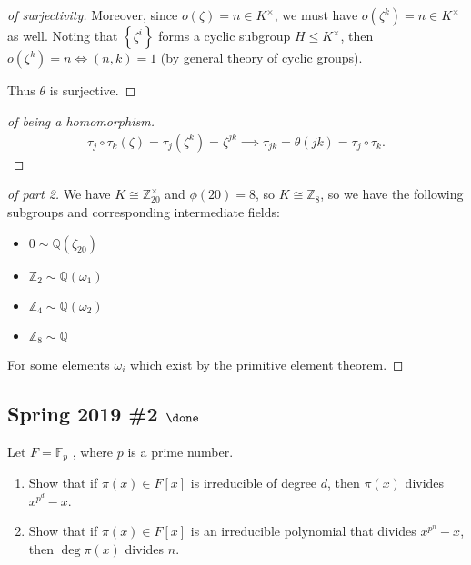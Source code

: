 \begin{solution}
\begin{proof}[of surjectivity]
Moreover, since \(o(\zeta) = n \in K^{\times}\), we must have
\(o(\zeta^k) = n \in K^{\times}\) as well. Noting that
\(\left\{{\zeta^i}\right\}\) forms a cyclic subgroup
\(H\leq K^{\times}\), then \(o(\zeta^k) = n \iff (n, k) = 1\) (by
general theory of cyclic groups).

Thus \(\theta\) is surjective.

\end{proof}

\begin{proof}[of being a homomorphism]

\begin{align*}
\tau_j \circ \tau_k (\zeta) =\tau_j(\zeta^k) = \zeta^{jk} \implies
\tau_{jk} = \theta(jk) = \tau_j \circ \tau_k
.\end{align*}

\end{proof}

\begin{proof}[of part 2]

We have \(K \cong {\mathbb{Z}}_{20}^{\times}\) and \(\phi(20) = 8\), so
\(K \cong {\mathbb{Z}}_8\), so we have the following subgroups and
corresponding intermediate fields:

\begin{itemize}
\tightlist
\item
  \(0 \sim {\mathbb{Q}}(\zeta_{20})\)
\item
  \({\mathbb{Z}}_2 \sim {\mathbb{Q}}(\omega_1)\)
\item
  \({\mathbb{Z}}_4 \sim {\mathbb{Q}}(\omega_2)\)
\item
  \({\mathbb{Z}}_8 \sim {\mathbb{Q}}\)
\end{itemize}

For some elements \(\omega_i\) which exist by the primitive element
theorem.

\end{proof}

\end{solution}

\hypertarget{spring-2019-2-done}{%
\subsection{\texorpdfstring{Spring 2019 \#2
\(\done\)}{Spring 2019 \#2 \textbackslash done}}\label{spring-2019-2-done}}

Let \(F = {\mathbb{F}}_p\) , where \(p\) is a prime number.

\begin{enumerate}
\def\labelenumi{\alph{enumi}.}
\item
  Show that if \(\pi(x) \in F[x]\) is irreducible of degree \(d\), then
  \(\pi(x)\) divides \(x^{p^d} - x\).
\item
  Show that if \(\pi(x) \in F[x]\) is an irreducible polynomial that
  divides \(x^{p^n} - x\), then \(\deg \pi(x)\) divides \(n\).
\end{enumerate}

